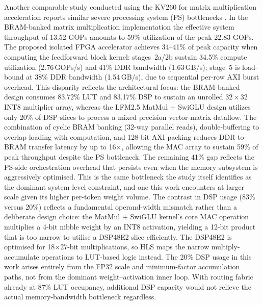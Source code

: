 \documentclass[manuscript,]{acmart} %
\begin{document}
Another comparable study conducted using the KV260 for matrix multiplication acceleration reports similar severe processing system (PS) bottlenecks \cite{11311069}. In the BRAM-banked matrix multiplication implementation the effective system throughput of 13.52 GOPs amounts to 59\% utilization of the peak 22.83 GOPs. The proposed isolated FPGA accelerator achieves 34--41\% of peak capacity when computing the feedforward block kernel: stages~2a/2b sustain 34.5\% compute utilization (2.76\,GOPs/s) and 41\% DDR bandwidth (1.63\,GB/s); stage~5 is load-bound at 38\% DDR bandwidth (1.54\,GB/s), due to sequential per-row AXI burst overhead. This disparity reflects the architectural focus: the BRAM-banked design consumes 83.72\% LUT and 83.17\% DSP to sustain an unrolled $32{\times}32$ INT8 multiplier array, whereas the LFM2.5 MatMul + SwiGLU design utilizes only 20\% of DSP slices to process a mixed precision vector-matrix dataflow. The combination of cyclic BRAM banking (32-way parallel reads), double-buffering to overlap loading with computation, and 128-bit AXI packing reduces DDR-to-BRAM transfer latency by up to 16$\times$, allowing the MAC array to sustain 59\% of peak throughput despite the PS bottleneck. The remaining 41\% gap reflects the PS-side orchestration overhead that persists even when the memory subsystem is aggressively optimised. This is the same bottleneck the study itself identifies as the dominant system-level constraint, and one this work encounters at larger scale given its higher per-token weight volume. The contrast in DSP usage (83\% versus 20\%) reflects a fundamental operand-width mismatch rather than a deliberate design choice: the MatMul + SwiGLU kernel's core MAC operation multiplies a 4-bit nibble weight by an INT8 activation, yielding a 12-bit product that is too narrow to utilise a DSP48E2 slice efficiently. The DSP48E2 is optimised for 18$\times$27-bit multiplications, so HLS maps the narrow multiply-accumulate operations to LUT-based logic instead. The 20\% DSP usage in this work arises entirely from the FP32 scale and minimum-factor accumulation paths, not from the dominant weight--activation inner loop. With routing fabric already at 87\% LUT occupancy, additional DSP capacity would not relieve the actual memory-bandwidth bottleneck regardless.
\end{document}
